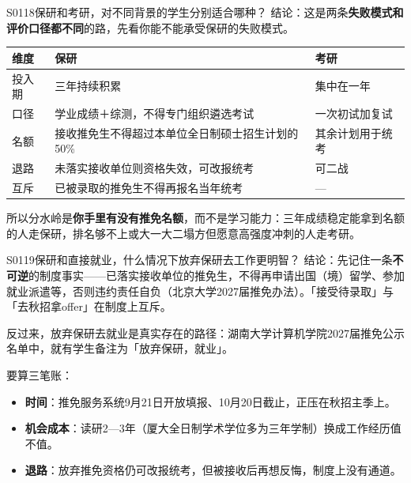 \begin{qa}{S0118}{保研和考研，对不同背景的学生分别适合哪种？}
结论：这是两条\textbf{失败模式和评价口径都不同}的路，先看你能不能承受保研的失败模式。

\par\vspace{2pt}\nobreak\begin{center}\footnotesize
\begin{tabularx}{\textwidth}{>{\raggedright\arraybackslash}X>{\raggedright\arraybackslash}X>{\raggedright\arraybackslash}X}
\toprule
\textbf{维度} & \textbf{保研} & \textbf{考研} \\ \midrule
投入期 & 三年持续积累 & 集中在一年 \\
口径 & 学业成绩＋综测，不得专门组织遴选考试 & 一次初试加复试 \\
名额 & 接收推免生不得超过本单位全日制硕士招生计划的50\% & 其余计划用于统考 \\
退路 & 未落实接收单位则资格失效，可改报统考 & 可二战 \\
互斥 & 已被录取的推免生不得再报名当年统考 & — \\
\bottomrule
\end{tabularx}
\end{center}\vspace{2pt}\par

所以分水岭是\textbf{你手里有没有推免名额}，而不是学习能力：三年成绩稳定能拿到名额的人走保研，排名够不上或大一大二塌方但愿意高强度冲刺的人走考研。
\end{qa}

\begin{qa}{S0119}{保研和直接就业，什么情况下放弃保研去工作更明智？}
结论：先记住一条\textbf{不可逆}的制度事实——已落实接收单位的推免生，不得再申请出国（境）留学、参加就业派遣等，否则违约责任自负（北京大学2027届推免办法）。「接受待录取」与「去秋招拿offer」在制度上互斥。

反过来，放弃保研去就业是真实存在的路径：湖南大学计算机学院2027届推免公示名单中，就有学生备注为「放弃保研，就业」。

要算三笔账：
\begin{itemize}
  \item \textbf{时间}：推免服务系统9月21日开放填报、10月20日截止，正压在秋招主季上。
  \item \textbf{机会成本}：读研2—3年（厦大全日制学术学位多为三年学制）换成工作经历值不值。
  \item \textbf{退路}：放弃推免资格仍可改报统考，但被接收后再想反悔，制度上没有通道。
\end{itemize}
\end{qa}

